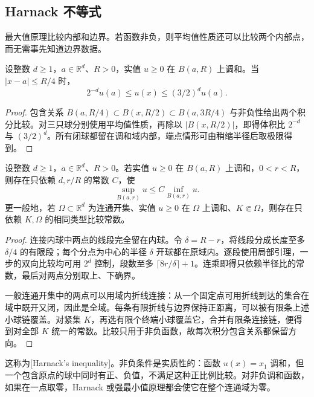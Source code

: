 \subsection{Harnack 不等式}
\label{b2:subsec:130103}

最大值原理比较内部和边界。若函数非负，则平均值性质还可以比较两个内部点，而无需事先知道边界数据。

\begin{lemma}\label{b2:lem:13-local-harnack}
设整数 \(d\geq1\)，\(a\in\mathbb R^d\)、\(R>0\)，实值 \(u\ge0\) 在 \(B(a,R)\) 上调和。当 \(|x-a|\leq R/4\) 时，
\[
 2^{-d}u(a)\leq u(x)\leq(3/2)^d u(a).
\]
\end{lemma}
\begin{proof}
包含关系 \(B(a,R/4)\subset B(x,R/2)\subset B(a,3R/4)\) 与非负性给出两个积分比较。对三只球分别使用平均值性质，再除以 \(|B(x,R/2)|\)，即得体积比 \(2^{-d}\) 与 \((3/2)^d\)。所有闭球都留在调和域内部，端点情形可由稍缩半径后取极限得到。
\end{proof}

\begin{theorem}[Harnack]\label{b2:thm:13-harnack}
设整数 \(d\geq1\)，\(a\in\mathbb R^d\)、\(R>0\)。若实值 \(u\ge0\) 在 \(B(a,R)\) 上调和，\(0<r<R\)，则存在只依赖 \(d,r/R\) 的常数 \(C\)，使
\[
 \sup_{B(a,r)}u\leq C\inf_{B(a,r)}u.
\]
更一般地，若 \(\Omega\subset\mathbb R^d\) 为连通开集、实值 \(u\ge0\) 在 \(\Omega\) 上调和、\(K\Subset\Omega\)，则存在只依赖 \(K,\Omega\) 的相同类型比较常数。
\end{theorem}
\begin{proof}
连接内球中两点的线段完全留在内球。令 \(\delta=R-r\)，将线段分成长度至多 \(\delta/4\) 的有限段；每个分点为中心的半径 \(\delta\) 开球都在原域内。逐段使用局部引理，一步的双向比较均可用 \(2^d\) 控制，段数至多 \(\lceil8r/\delta\rceil+1\)。连乘即得只依赖半径比的常数，最后对两点分别取上、下确界。

一般连通开集中的两点可以用域内折线连接：从一个固定点可用折线到达的集合在域中既开又闭，因此是全域。每条有限折线与边界保持正距离，可以被有限条上述小球链覆盖。对紧集 \(K\)，再选有限个终端小球覆盖它，合并有限条连接链，便得到对全部 \(K\) 统一的常数。比较只用于非负函数，故每次积分包含关系都保留方向。
\end{proof}

这称为[Harnack's inequality]。非负条件是实质性的：函数 \(u(x)=x_1\) 调和，但一个包含原点的球中同时有正、负值，不满足这种正比例比较。对非负调和函数，如果在一点取零，Harnack 或强最小值原理都会使它在整个连通域为零。

